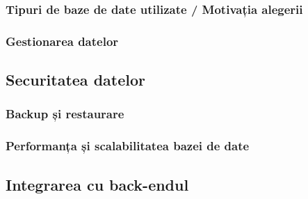 \subsubsection{Tipuri de baze de date utilizate / Motivația alegerii}
\subsubsection{Gestionarea datelor}
\subsection{Securitatea datelor}
\subsubsection{Backup și restaurare}
\subsubsection{Performanța și scalabilitatea bazei de date}
\subsection{Integrarea cu back-endul}